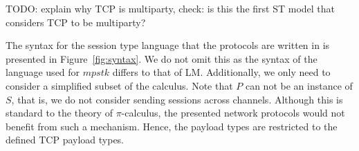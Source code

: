\documentclass{article}
\newcommand{\todo}[1]{}
\renewcommand{\todo}[1]{{\color{red} TODO: {#1}}}
\begin{document}
\todo{explain why TCP is multiparty, check: is this the first ST model that considers TCP to be multiparty?}

The syntax for the session type language that the protocols are written in is presented in Figure~\ref{fig:syntax}.
We do not omit this as the syntax of the language used for \ensuremath{mpstk} differs to that of LM.
Additionally, we only need to consider a simplified subset of the calculus.
Note that \ensuremath{P} can not be an instance of \ensuremath{S}, that is, we do not consider sending sessions across channels.
Although this is standard to the theory of \ensuremath{\pi}-calculus, the presented network protocols would not benefit from such a mechanism.
Hence, the payload types are restricted to the defined TCP payload types.

\medskip
\nocite{*}
\printbibliography
\end{document}
